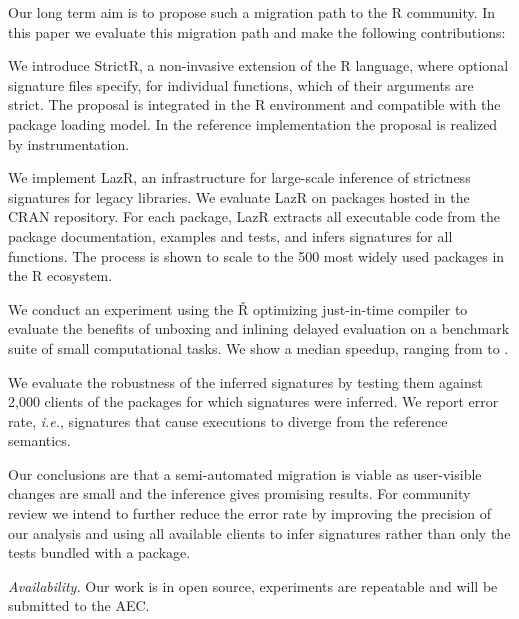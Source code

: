 \documentclass[review,nonacm,screen,acmsmall,anonymous=true]{acmart}
\newcommand{\strictr}{{\sf StrictR}\xspace}
\newcommand{\lazr}{{\sf LazR}\xspace}
\renewcommand{\Rsh}{{\sf\v R}\xspace}
\newcommand{\ie}{\emph{i.e.},\xspace}
\begin{document}
\medskip
\noindent Our long term aim is to propose such a migration path to the R community. In
this paper we evaluate this migration path and make the following contributions:
\vspace{1mm}

\begin{compactitem}[---]
\item We introduce \strictr, a non-invasive extension of the R language, where
  optional signature files specify, for individual functions, which of their
  arguments are strict. The proposal is integrated in the R environment and
  compatible with the package loading model. In the reference implementation the
  proposal is realized by instrumentation.
\item We implement \lazr, an infrastructure for large-scale inference of
  strictness signatures for legacy libraries. We evaluate \lazr on packages
  hosted in the CRAN repository. For each package, \lazr extracts all executable
  code from the package documentation, examples and tests, and infers signatures
  for all functions. The process is shown to scale to the 500 most widely used
  packages in the R ecosystem.
\item We conduct an experiment using the \Rsh optimizing just-in-time compiler
  to evaluate the benefits of unboxing and inlining delayed evaluation on a
  benchmark suite of small computational tasks. We show a median
  \speedupRshStrict speedup, ranging from \speedupRshStrictMin to
  \speedupRshStrictMax.
\item We evaluate the robustness of the inferred signatures by testing them
  against 2,000 clients of the packages for which signatures were inferred. We
  report \robustnesResult error rate, \ie signatures that cause executions to
  diverge from the reference semantics.

\end{compactitem}

\medskip

\noindent Our conclusions are that a semi-automated migration is viable as
user-visible changes are small and the inference gives promising results. For
community review we intend to further reduce the error rate by improving the
precision of our analysis and using all available clients to infer signatures
rather than only the tests bundled with a package.

{\small \medskip\noindent\emph{Availability.} Our work is in open source, experiments are
repeatable and will be submitted to the AEC.}
\end{document}

